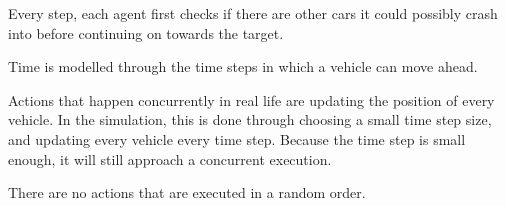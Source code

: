 Every step, each agent first checks if there are other cars it could possibly crash into before continuing on towards the target. 

Time is modelled through the time steps in which a vehicle can move ahead. 

Actions that happen concurrently in real life are updating the position of every vehicle. In the simulation, this is done through choosing a small time step size, and updating every vehicle every time step. Because the time step is small enough, it will still approach a concurrent execution.


There are no actions that are executed in a random order.
